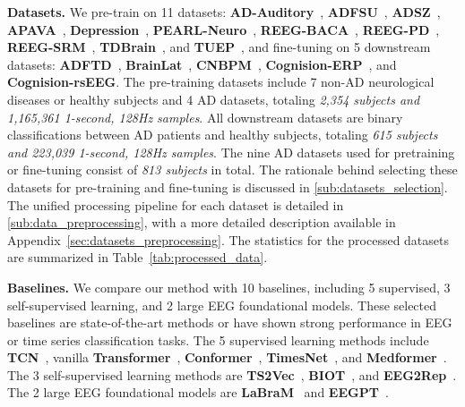 





\textbf{Datasets.}
We pre-train on 11 datasets: \textbf{AD-Auditory}~\cite{lahijanian2024auditory}, \textbf{ADFSU}~\cite{vicchietti2023computational}, \textbf{ADSZ}~\cite{pineda2020quantile}, \textbf{APAVA}~\cite{escudero2006analysis}, \textbf{Depression}~\cite{cavanagh2019multiple}, \textbf{PEARL-Neuro}~\cite{dzianok2024pearl}, \textbf{REEG-BACA}~\cite{getzmann2024resting}, \textbf{REEG-PD}~\cite{singh2023evoked}, \textbf{REEG-SRM}~\cite{hatlestad2022bids}, \textbf{TDBrain}~\cite{van2022two}, and \textbf{TUEP}~\cite{veloso2017big}, and fine-tuning on 5 downstream datasets: \textbf{ADFTD}~\cite{miltiadous2023dataset}, \textbf{BrainLat}~\cite{prado2023brainlat}, \textbf{CNBPM}~\cite{amezquita2019novel}, \textbf{Cognision-ERP}~\cite{cecchi2015clinical}, and \textbf{Cognision-rsEEG}. The pre-training datasets include 7 non-AD neurological diseases or healthy subjects and 4 AD datasets, totaling \textit{2,354 subjects and 1,165,361 1-second, 128Hz samples}. All downstream datasets are binary classifications between AD patients and healthy subjects, totaling \textit{615 subjects and 223,039 1-second, 128Hz samples}. The nine AD datasets used for pretraining or fine-tuning consist of \textit{813 subjects} in total. The rationale behind selecting these datasets for pre-training and fine-tuning is discussed in \ref{sub:datasets_selection}. The unified processing pipeline for each dataset is detailed in \ref{sub:data_preprocessing}, with a more detailed description available in Appendix~\ref{sec:datasets_preprocessing}. The statistics for the processed datasets are summarized in Table~\ref{tab:processed_data}.




\textbf{Baselines.}
We compare our method with 10 baselines, including 5 supervised, 3 self-supervised learning, and 2 large EEG foundational models. These selected baselines are state-of-the-art methods or have shown strong performance in EEG or time series classification tasks. The 5 supervised learning methods include \textbf{TCN}~\cite{bai2018empirical}, vanilla \textbf{Transformer}~\cite{vaswani2017attention}, \textbf{Conformer}~\cite{song2022eeg}, \textbf{TimesNet}~\cite{wu2023timesnet}, and \textbf{Medformer}~\cite{wang2024medformer}. The 3 self-supervised learning methods are \textbf{TS2Vec}~\cite{yue2022ts2vec}, \textbf{BIOT}~\cite{yang2024biot}, and \textbf{EEG2Rep}~\cite{mohammadi2024eeg2rep}. The 2 large EEG foundational models are \textbf{LaBraM}~\cite{jiang2024large} and \textbf{EEGPT}~\cite{wangeegpt}. 



